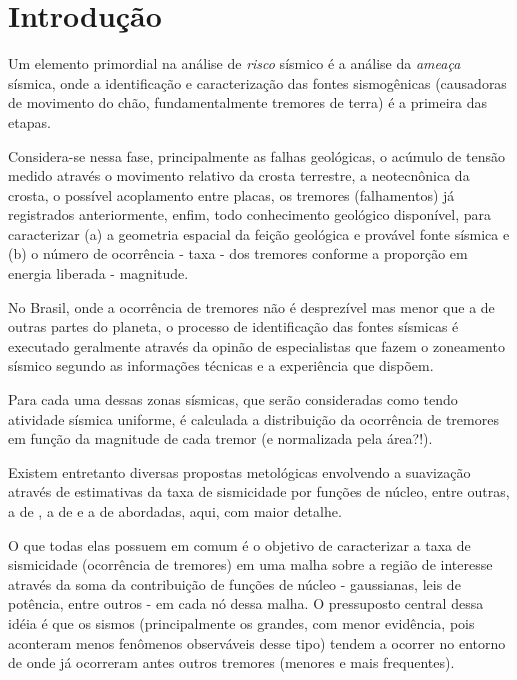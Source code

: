 \chapter{Introdução}
\label{cap:introducao}

Um elemento primordial na análise
de \emph{risco} sísmico é a análise da \emph{ameaça} sísmica,
onde a identificação e caracterização das fontes sismogênicas (causadoras de
movimento do chão, fundamentalmente tremores de terra) é a primeira das etapas. 

Considera-se nessa fase, principalmente as falhas
geológicas, o acúmulo de tensão medido através o movimento relativo da crosta
terrestre, a neotecnônica da crosta, o possível acoplamento entre placas, os tremores
(falhamentos) já registrados anteriormente, enfim, todo conhecimento geológico
disponível, para caracterizar (a) a geometria espacial da feição geológica e provável fonte
sísmica e (b) o número de ocorrência - taxa - dos tremores conforme a
proporção em energia liberada - magnitude.

No Brasil, onde a ocorrência de tremores não é desprezível mas menor que a de
outras partes do planeta, o processo de identificação das fontes sísmicas é
executado geralmente através da opinão de especialistas que fazem o zoneamento
sísmico segundo as informações técnicas e a experiência que dispõem.

Para cada uma dessas zonas sísmicas, que serão consideradas como tendo atividade
sísmica uniforme, é calculada a distribuição da ocorrência de tremores em função
da magnitude de cada tremor (e normalizada pela área?!).

Existem entretanto diversas propostas metológicas envolvendo a suavização através de 
estimativas da taxa de sismicidade por funções de núcleo, entre outras, a de
\citet{frankel_mapping_1995}, a de \citet{woo_1996} e a de
\citet{helmstetter_2012} abordadas, aqui, com maior detalhe.

O que todas elas possuem em comum é o objetivo de caracterizar a taxa de
sismicidade (ocorrência de tremores) em uma malha sobre a região de interesse
através da soma da contribuição de funções de núcleo - gaussianas, leis de
potência, entre outros - em cada nó dessa malha. O pressuposto central dessa
idéia é que os sismos (principalmente os grandes, com menor evidência, pois
aconteram menos fenômenos observáveis desse tipo) tendem a ocorrer no entorno de
onde já ocorreram antes outros tremores (menores e mais frequentes).

